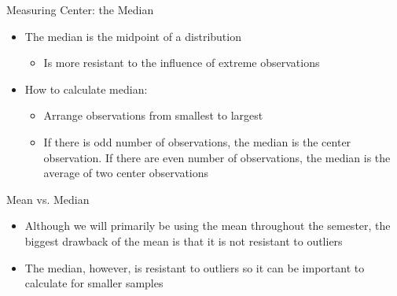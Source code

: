\documentclass{beamer}
\begin{document}
\begin{frame}{Measuring Center: the Median}
	
	\begin{itemize}
		\item The \alert{median} is the midpoint of a distribution
		      \begin{itemize}
		      	\item Is more resistant to the influence of extreme observations 
		      \end{itemize}
		\item How to calculate median:
		      \begin{itemize}
		      	\item Arrange observations from smallest to largest
		      	\item If there is odd number of observations, the median is the center observation. If there are even number of observations, the median is the average of two center observations
		      \end{itemize}
	\end{itemize}
\end{frame}

\begin{frame}{Mean vs. Median}
	
	\begin{itemize}
		\item Although we will primarily be using the mean throughout the semester, the biggest drawback of the mean is that it is not resistant to outliers
		      
		\item The median, however, is resistant to outliers so it can be important to calculate for smaller samples 
	\end{itemize}
	
\end{frame}

\end{document}
